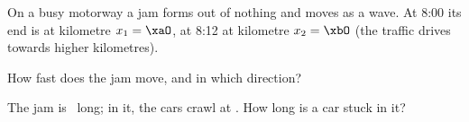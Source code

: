 On a busy motorway a jam forms out of nothing and moves as a wave. At 8:00 its end is at kilometre $x_1 = \xaO$, at 8:12 at kilometre $x_2 = \xbO$ (the traffic drives towards higher kilometres).

\begin{abcliste}
\abc How fast does the jam move, and in which direction?

\abc The jam is \LjO\ long; in it, the cars crawl at \vcO. How long is a car stuck in it?
\end{abcliste}
